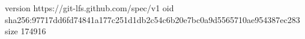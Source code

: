 version https://git-lfs.github.com/spec/v1
oid sha256:97717dd6fd74841a177c251d1db2c54c6b20e7bc0a9d5565710ae954387ec283
size 174916
